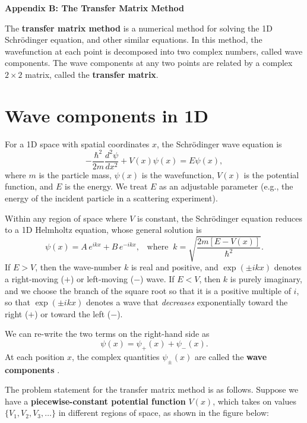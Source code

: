 \documentclass[pra,12pt]{revtex4}
\begin{document}
\begin{center}
{\large \textbf{Appendix B: The Transfer Matrix Method}}
\end{center}

\noindent
The \textbf{transfer matrix method} is a numerical method for solving
the 1D Schr\"odinger equation, and other similar equations.  In this
method, the wavefunction at each point is decomposed into two complex
numbers, called wave components.  The wave components at any two
points are related by a complex $2\times2$ matrix, called the
\textbf{transfer matrix}.

\section{Wave components in 1D}

For a 1D space with spatial coordinates $x$, the Schr\"odinger wave
equation is
\begin{equation}
  -\frac{\hbar^2}{2m}\frac{d^2\psi}{dx^2} + V(x) \psi(x) = E\psi(x),
\end{equation}
where $m$ is the particle mass, $\psi(x)$ is the wavefunction, $V(x)$
is the potential function, and $E$ is the energy.  We treat $E$ as an
adjustable parameter (e.g., the energy of the incident particle in a
scattering experiment).

Within any region of space where $V$ is constant, the Schr\"odinger
equation reduces to a 1D Helmholtz equation, whose general solution is
\begin{equation}
  \psi(x) = A\, e^{ik x} + B\, e^{-ik x}, \;\;\; \mathrm{where}\;\; k = \sqrt{\frac{2m[E-V(x)]}{\hbar^2}}.
\end{equation}
If $E > V$, then the wave-number $k$ is real and positive, and
$\exp(\pm ikx)$ denotes a right-moving ($+$) or left-moving ($-$)
wave.  If $E < V$, then $k$ is purely imaginary, and we choose the
branch of the square root so that it is a positive multiple of $i$, so
that $\exp(\pm ikx)$ denotes a wave that \textit{decreases}
exponentially toward the right ($+$) or toward the left ($-$).

We can re-write the two terms on the right-hand side as
\begin{equation}
  \psi(x) = \psi_+(x) + \psi_-(x).
\end{equation}
At each position $x$, the complex quantities $\psi_\pm(x)$ are called
the \textbf{wave components} .

The problem statement for the transfer matrix method is as follows.
Suppose we have a \textbf{piecewise-constant potential function}
$V(x)$, which takes on values $\{V_1, V_2, V_3, \dots\}$ in different
regions of space, as shown in the figure below:
\end{document}
